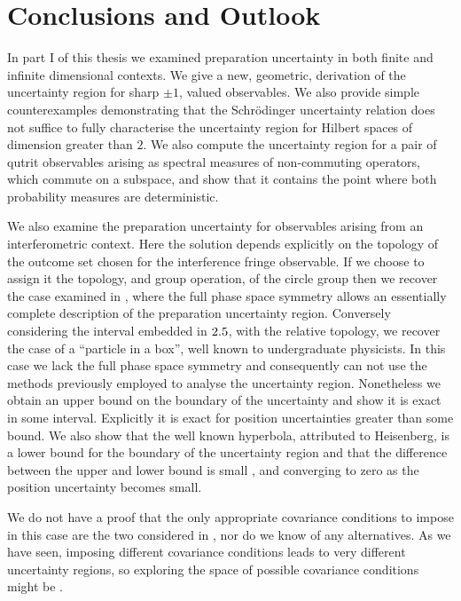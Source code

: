 \let\textcircled=\pgftextcircled
\chapter{Conclusions and Outlook} \label{chap:conclusion}


In part I of this thesis we examined preparation uncertainty in both finite and infinite dimensional contexts. We give a new, geometric, derivation of the uncertainty region for sharp $\pm 1$, valued observables. We also provide simple counterexamples demonstrating that the Schr\"odinger uncertainty relation does not suffice to fully characterise the uncertainty region for Hilbert spaces of dimension greater than $2$. We also compute the uncertainty region for a pair of qutrit observables arising as spectral measures of non-commuting operators, which commute on a subspace, and show that it contains the point where both probability measures are deterministic. 

We also examine the preparation uncertainty for observables arising from an interferometric context. Here the solution depends explicitly on the topology of the outcome set chosen for the interference fringe observable. If we choose to assign it the topology, and group operation, of the circle group then we recover the case examined in , where the full phase space symmetry allows an essentially complete description of the preparation uncertainty region. Conversely considering the interval embedded in $2.5$, with the relative topology, we recover the case of a ``particle in a box'', well known to undergraduate physicists. In this case we lack the full phase space symmetry and consequently can not use the methods previously employed to analyse the uncertainty region. Nonetheless we obtain an upper bound on the boundary of the uncertainty and show it is exact in some interval. Explicitly it is exact for position uncertainties greater than some bound. We also show that the well known hyperbola, attributed to Heisenberg, is a lower bound for the boundary of the uncertainty region and that the difference between the upper and lower bound is small , and converging to zero as the position uncertainty becomes small.

We do not have a proof that the only appropriate covariance conditions to impose in this case are the two considered in , nor do we know of any alternatives. As we have seen, imposing different covariance conditions leads to very different uncertainty regions, so exploring the space of possible covariance conditions might be . 

